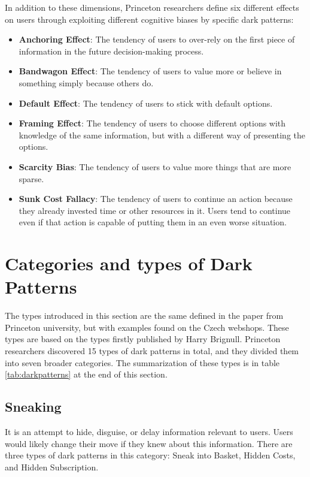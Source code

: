 In addition to these dimensions, Princeton researchers define six different effects on users through exploiting different cognitive biases by specific dark patterns:

\begin{itemize}
    \item \textbf{Anchoring Effect}: The tendency of users to over-rely on the first piece of information in the future decision-making process.
    \item \textbf{Bandwagon Effect}: The tendency of users to value more or believe in something simply because others do.
    \item \textbf{Default Effect}: The tendency of users to stick with default options.
    \item \textbf{Framing Effect}: The tendency of users to choose different options with knowledge of the same information, but with a different way of presenting the options.
    \item \textbf{Scarcity Bias}: The tendency of users to value more things that are more sparse.
    \item \textbf{Sunk Cost Fallacy}: The tendency of users to continue an action because they already invested time or other resources in it. Users tend to continue even if that action is capable of putting them in an even worse situation.
\end{itemize}

\section{Categories and types of Dark Patterns}
The types introduced in this section are the same defined in the paper from Princeton university\cite{dark-patterns-at-scale}, but with examples found on the Czech webshops. These types are based on the types firstly published by Harry Brignull\cite{dark-patterns-brignull}.
Princeton researchers discovered 15 types of dark patterns in total, and they divided them into seven broader categories. The summarization of these types is in table \ref{tab:darkpatterns} at the end of this section.
    \subsection{Sneaking}
    It is an attempt to hide, disguise, or delay information relevant to users. Users would likely change their move if they knew about this information. There are three types of dark patterns in this category: Sneak into Basket, Hidden Costs, and Hidden Subscription.
